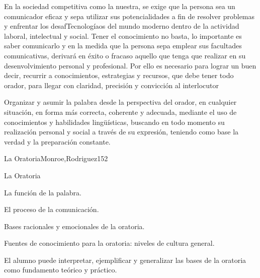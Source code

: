 \begin{syllabus}


\begin{justification}
En la sociedad competitiva como la nuestra,  se exige que la persona sea un comunicador eficaz y  sepa utilizar sus potencialidades a fin de resolver problemas y enfrentar los desafTecnologíaos del mundo moderno dentro de la actividad laboral, intelectual y social. Tener el conocimiento no basta, lo importante es saber comunicarlo y en la medida que la persona sepa emplear sus facultades comunicativas, derivará en éxito o fracaso aquello que tenga que realizar en su desenvolvimiento personal y profesional. Por ello es necesario para lograr un buen decir, recurrir a conocimientos, estrategias y recursos, que debe tener todo orador, para llegar con claridad, precisión y convicción al interlocutor
\end{justification}

\begin{goals}
\item Organizar y asumir la palabra desde la perspectiva del orador, en cualquier situación, en forma más correcta, coherente  y adecuada, mediante el uso de conocimientos y habilidades lingüísticas, buscando en todo momento su realización personal y social  a través de su expresión, teniendo como base  la verdad y la preparación constante.  
\end{goals}

\begin{outcomes}
\end{outcomes}

\begin{unit}{La Oratoria}{Monroe,Rodriguez}{15}{2}
\begin{topics}
	\item La Oratoria
	\item La función de la palabra.
	\item El proceso de la comunicación.
	\item Bases racionales y emocionales de la oratoria.
	\item Fuentes de conocimiento para la oratoria: niveles de cultura general.
\end{topics}
\begin{learningoutcomes}
	\item El alumno puede interpretar, ejemplificar y generalizar las bases de la oratoria como fundamento teórico  y  práctico.
\end{learningoutcomes}
\end{unit}


\end{syllabus}
